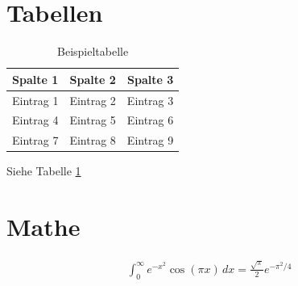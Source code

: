 \documentclass[11pt, paper=A4]{scrartcl} %
\begin{document}

\tableofcontents

\thispagestyle{empty}

\newpage

\setcounter{page}{1}


\section{Tabellen}\label{tabellen}

\begin{table}[H] %
  \centering
  \begin{tabular}{|l|c|r|} %
    \hline
    \textbf{Spalte 1} & \textbf{Spalte 2} & \textbf{Spalte 3} \\ %
    \hline
    Eintrag 1 & Eintrag 2 & Eintrag 3 \\ %
    \hline
    Eintrag 4 & Eintrag 5 & Eintrag 6 \\ %
    \hline
    Eintrag 7 & Eintrag 8 & Eintrag 9 \\ %
    \hline
  \end{tabular}
  \caption{Beispieltabelle} %
  \label{tab:example} %
\end{table}

Siehe Tabelle \ref{tab:example} %


\section{Mathe}\label{mathe}

\[
\begin{aligned}
  \int_{0}^{\infty} e^{-x^2} \cos(\pi x) \, dx = \frac{\sqrt{\pi}}{2} e^{-\pi^2/4}
\end{aligned}
\]

\end{document}
